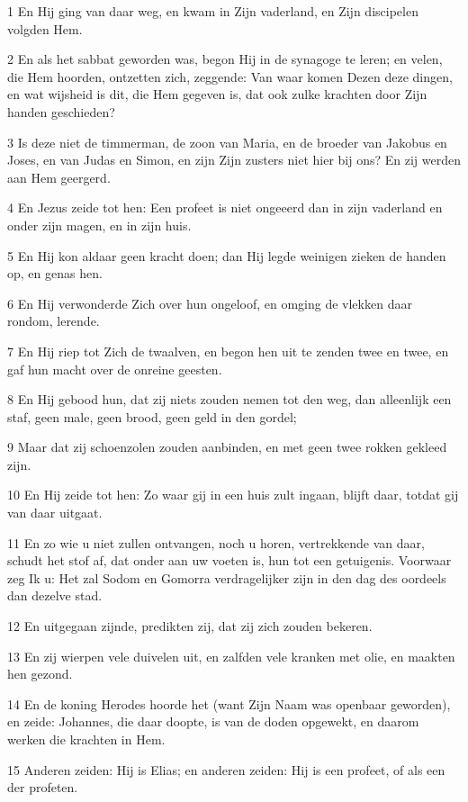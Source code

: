 \par 1 En Hij ging van daar weg, en kwam in Zijn vaderland, en Zijn discipelen volgden Hem.
\par 2 En als het sabbat geworden was, begon Hij in de synagoge te leren; en velen, die Hem hoorden, ontzetten zich, zeggende: Van waar komen Dezen deze dingen, en wat wijsheid is dit, die Hem gegeven is, dat ook zulke krachten door Zijn handen geschieden?
\par 3 Is deze niet de timmerman, de zoon van Maria, en de broeder van Jakobus en Joses, en van Judas en Simon, en zijn Zijn zusters niet hier bij ons? En zij werden aan Hem geergerd.
\par 4 En Jezus zeide tot hen: Een profeet is niet ongeeerd dan in zijn vaderland en onder zijn magen, en in zijn huis.
\par 5 En Hij kon aldaar geen kracht doen; dan Hij legde weinigen zieken de handen op, en genas hen.
\par 6 En Hij verwonderde Zich over hun ongeloof, en omging de vlekken daar rondom, lerende.
\par 7 En Hij riep tot Zich de twaalven, en begon hen uit te zenden twee en twee, en gaf hun macht over de onreine geesten.
\par 8 En Hij gebood hun, dat zij niets zouden nemen tot den weg, dan alleenlijk een staf, geen male, geen brood, geen geld in den gordel;
\par 9 Maar dat zij schoenzolen zouden aanbinden, en met geen twee rokken gekleed zijn.
\par 10 En Hij zeide tot hen: Zo waar gij in een huis zult ingaan, blijft daar, totdat gij van daar uitgaat.
\par 11 En zo wie u niet zullen ontvangen, noch u horen, vertrekkende van daar, schudt het stof af, dat onder aan uw voeten is, hun tot een getuigenis. Voorwaar zeg Ik u: Het zal Sodom en Gomorra verdragelijker zijn in den dag des oordeels dan dezelve stad.
\par 12 En uitgegaan zijnde, predikten zij, dat zij zich zouden bekeren.
\par 13 En zij wierpen vele duivelen uit, en zalfden vele kranken met olie, en maakten hen gezond.
\par 14 En de koning Herodes hoorde het (want Zijn Naam was openbaar geworden), en zeide: Johannes, die daar doopte, is van de doden opgewekt, en daarom werken die krachten in Hem.
\par 15 Anderen zeiden: Hij is Elias; en anderen zeiden: Hij is een profeet, of als een der profeten.
